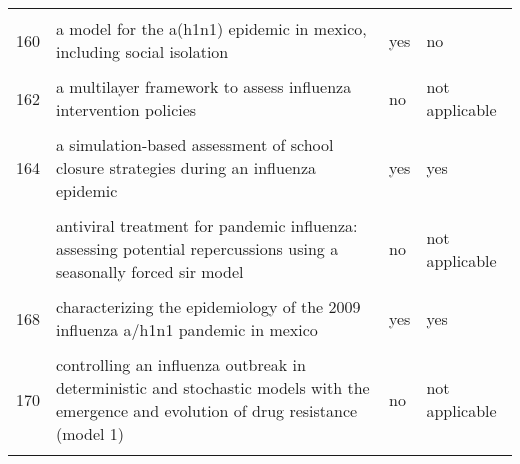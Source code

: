 \documentclass[
]{article}
\begin{document}
\begin{landscape}
\begin{longtable}{l>{\raggedright\arraybackslash}p{9cm}ll}
\cellcolor{gray!6}{159} & \cellcolor{gray!6}{a deterministic resource scheduling model in epidemic control: a case study} & \cellcolor{gray!6}{no} & \cellcolor{gray!6}{not applicable}\\
160 & a model for the a(h1n1) epidemic in mexico, including social isolation & yes & no\\
\addlinespace
\cellcolor{gray!6}{161} & \cellcolor{gray!6}{a model to evaluate mass vaccination against pneumococcus as a countermeasure against pandemic influenza} & \cellcolor{gray!6}{yes} & \cellcolor{gray!6}{yes}\\
162 & a multilayer framework to assess influenza intervention policies & no & not applicable\\
\cellcolor{gray!6}{163} & \cellcolor{gray!6}{a note on the use of optimal control on a discrete time model of influenza dynamics} & \cellcolor{gray!6}{no} & \cellcolor{gray!6}{not applicable}\\
164 & a simulation-based assessment of school closure strategies during an influenza epidemic & yes & yes\\
\cellcolor{gray!6}{165} & \cellcolor{gray!6}{agent-based modeling of the spread of influenza-like illness in an emergency department: a simulation study} & \cellcolor{gray!6}{yes} & \cellcolor{gray!6}{no}\\
\addlinespace
166 & antiviral treatment for pandemic influenza: assessing potential repercussions using a seasonally forced sir model & no & not applicable\\
\cellcolor{gray!6}{167} & \cellcolor{gray!6}{can antiviral drugs contain pandemic influenza transmission?} & \cellcolor{gray!6}{yes} & \cellcolor{gray!6}{no}\\
168 & characterizing the epidemiology of the 2009 influenza a/h1n1 pandemic in mexico & yes & yes\\
\cellcolor{gray!6}{169} & \cellcolor{gray!6}{cholera epidemic in haiti, 2010: using a transmission model to explain spatial spread of disease and identify optimal control interventions} & \cellcolor{gray!6}{yes} & \cellcolor{gray!6}{yes}\\
170 & controlling an influenza outbreak in deterministic and stochastic models with the emergence and evolution of drug resistance (model 1) & no & not applicable\\
\addlinespace
\cellcolor{gray!6}{171} & \cellcolor{gray!6}{modeling control strategies for concurrent epidemics of seasonal and pandemic h1n1 influenza} & \cellcolor{gray!6}{no} & \cellcolor{gray!6}{not applicable}\\

\end{longtable}
\end{landscape}
\end{document}
